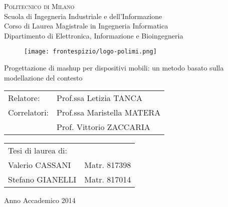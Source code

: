 \begin{titlepage}

\begin{center}
\Large{\textsc{Politecnico di Milano}}\\
\Large{Scuola di Ingegneria Industriale e dell'Informazione}\\
\large{Corso di Laurea Magistrale in Ingegneria Informatica}\\
\large{Dipartimento di Elettronica, Informazione e Bioingegneria}
\par\end{center}

\vspace{0.5cm}


\begin{center}
\begin{figure}[h]
\centering{}\texttt{[image: frontespizio/logo-polimi.png]}
\end{figure}
\vspace{1cm}

\par\end{center}

\begin{center}
\LARGE{Progettazione di mashup per dispositivi mobili: un metodo basato sulla modellazione del contesto}\vspace{2cm}

\par\end{center}

\begin{flushleft}
\begin{tabular}{ll}
Relatore:  & Prof.ssa Letizia TANCA\tabularnewline
Correlatori:  & Prof.ssa Maristella MATERA\tabularnewline
	& Prof. Vittorio ZACCARIA
\end{tabular}\vspace{1cm}

\par\end{flushleft}

\begin{flushright}
\begin{tabular}{ll}
Tesi di laurea di: & \tabularnewline
Valerio CASSANI & Matr. 817398\tabularnewline
Stefano GIANELLI & Matr. 817014\tabularnewline
\end{tabular}\vspace{2.2cm}

\par\end{flushright}

\begin{center}
{\large{}Anno Accademico 2014}
\par\end{center}{\large \par}

\end{titlepage}
